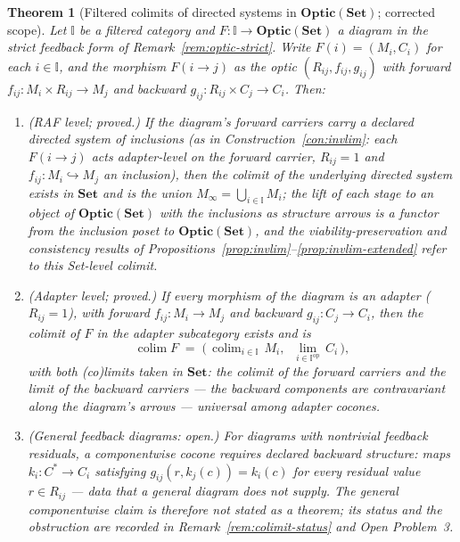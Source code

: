 \documentclass[11pt,a4paper]{article}
\theoremstyle{plain}
\newtheorem{theorem}{Theorem}[section]
\theoremstyle{definition}
\theoremstyle{remark}
\newcommand{\Optic}{\mathbf{Optic}}
\newcommand{\colim}{\operatorname{colim}}
\begin{document}
\begin{theorem}[Filtered colimits of directed systems in
$\Optic(\mathbf{Set})$; corrected scope]
\label{thm:filtered-colimits-optic}
Let $\mathbb I$ be a filtered category and
$F:\mathbb I\to\Optic(\mathbf{Set})$ a diagram in the strict feedback
form of Remark~\ref{rem:optic-strict}. Write $F(i)=(M_{i},C_{i})$ for
each $i\in\mathbb I$, and the morphism $F(i\to j)$ as the optic
$(R_{ij},f_{ij},g_{ij})$ with forward
$f_{ij}:M_{i}\times R_{ij}\to M_{j}$ and backward
$g_{ij}:R_{ij}\times C_{j}\to C_{i}$. Then:
\begin{enumerate}[leftmargin=*,itemsep=2pt]
\item[\emph{(i)}] \emph{(RAF level; proved.)} If the diagram's
  forward carriers carry a declared directed system of inclusions
  (as in Construction~\ref{con:invlim}: each $F(i\to j)$ acts
  adapter-level on the forward carrier, $R_{ij}=1$ and
  $f_{ij}:M_i\hookrightarrow M_j$ an inclusion), then the colimit of
  the underlying directed system exists in $\mathbf{Set}$ and is the
  union $M_{\infty}=\bigcup_{i\in\mathbb I}M_{i}$; the lift of each
  stage to an object of $\Optic(\mathbf{Set})$ with the inclusions as
  structure arrows is a functor from the inclusion poset to
  $\Optic(\mathbf{Set})$, and the viability-preservation and
  consistency results of
  Propositions~\ref{prop:invlim}--\ref{prop:invlim-extended} refer to
  this Set-level colimit.
\item[\emph{(ii)}] \emph{(Adapter level; proved.)} If every morphism
  of the diagram is an adapter ($R_{ij}=1$), with forward
  $f_{ij}:M_{i}\to M_{j}$ and backward $g_{ij}:C_{j}\to C_{i}$, then
  the colimit of $F$ in the adapter subcategory exists and is
  \begin{equation}\label{eq:filtered-colim}
    \colim F \;=\; \bigl(\,\colim_{i\in\mathbb I}\,M_{i},\;\;
    \lim_{i\in\mathbb I^{\mathrm{op}}}\,C_{i}\,\bigr),
  \end{equation}
  with both (co)limits taken in $\mathbf{Set}$: the colimit of the
  forward carriers and the \emph{limit} of the backward carriers ---
  the backward components are contravariant along the diagram's
  arrows --- universal among adapter cocones.
\item[\emph{(iii)}] \emph{(General feedback diagrams: open.)} For
  diagrams with nontrivial feedback residuals, a componentwise
  cocone requires \emph{declared backward structure}: maps
  $k_{i}:C^{*}\to C_{i}$ satisfying $g_{ij}(r,k_{j}(c))=k_{i}(c)$
  for every residual value $r\in R_{ij}$ --- data that a general
  diagram does not supply. The general componentwise claim is
  therefore not stated as a theorem; its status and the obstruction
  are recorded in Remark~\ref{rem:colimit-status} and
  Open Problem~3.
\end{enumerate}
\end{theorem}
\end{document}
